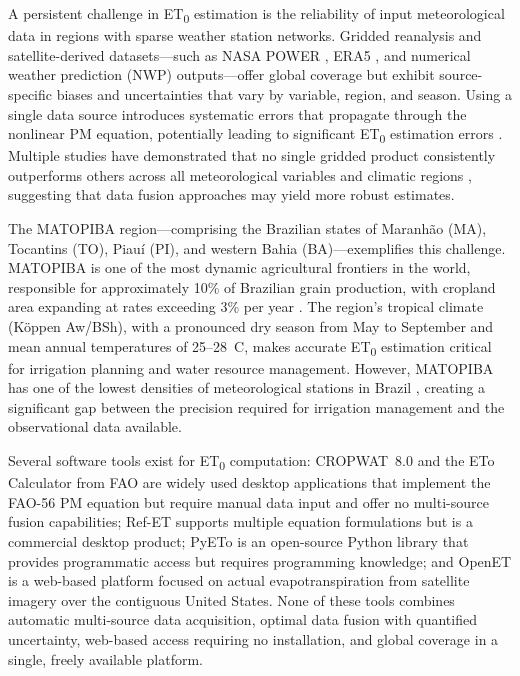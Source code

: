 \documentclass[preprint,review,12pt]{elsarticle}
\begin{document}
A persistent challenge in ET\textsubscript{0} estimation is the reliability of
input meteorological data in regions with sparse weather station networks.
Gridded reanalysis and satellite-derived datasets---such as NASA POWER
\citep{Stackhouse2018}, ERA5 \citep{Hersbach2020}, and numerical weather
prediction (NWP) outputs---offer global coverage but exhibit source-specific
biases and uncertainties that vary by variable, region, and season. Using a
single data source introduces systematic errors that propagate through the
nonlinear PM equation, potentially leading to significant ET\textsubscript{0}
estimation errors \citep{Bai2010, Blankenau2020, Paredes2020}. Multiple
studies have demonstrated that no single gridded product consistently
outperforms others across all meteorological variables and climatic regions
\citep{Monteiro2022, Sheffield2006}, suggesting that data fusion approaches
may yield more robust estimates.

The MATOPIBA region---comprising the Brazilian states of Maranh\~ao (MA),
Tocantins (TO), Piau\'i (PI), and western Bahia (BA)---exemplifies this
challenge. MATOPIBA is one of the most dynamic agricultural frontiers in the
world, responsible for approximately 10\% of Brazilian grain production, with
cropland area expanding at rates exceeding 3\% per year
\citep{Miranda2014, Bolfe2016}. The region's tropical climate (K\"oppen
Aw/BSh), with a pronounced dry season from May to September and mean annual
temperatures of 25--28~\textdegree{}C, makes accurate
ET\textsubscript{0} estimation critical for irrigation planning and water
resource management. However, MATOPIBA has one of the lowest densities of
meteorological stations in Brazil \citep{Xavier2016}, creating a significant
gap between the precision required for irrigation management and the
observational data available.

Several software tools exist for ET\textsubscript{0} computation: CROPWAT~8.0
\citep{cropwat} and the ETo Calculator \citep{etocalculator} from FAO are
widely used desktop applications that implement the FAO-56 PM equation but
require manual data input and offer no multi-source fusion capabilities;
Ref-ET \citep{refet} supports multiple equation formulations but is a
commercial desktop product; PyETo \citep{pyeto} is an open-source Python
library that provides programmatic access but requires programming knowledge;
and OpenET \citep{openet} is a web-based platform focused on actual
evapotranspiration from satellite imagery over the contiguous United States.
None of these tools combines automatic multi-source data acquisition, optimal
data fusion with quantified uncertainty, web-based access requiring no
installation, and global coverage in a single, freely available platform.
\end{document}
